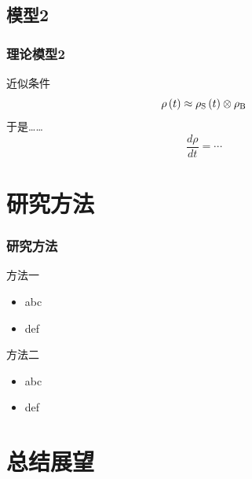 \documentclass[aspectratio=169]{ctexbeamer}
\begin{document}
\subsection{模型2}
\begin{frame}
  \frametitle{理论模型2}
  近似条件
  \begin{equation*}
    \rho\left(t\right)\approx\rho_{\rm S}\left(t\right)\otimes\rho_{\rm B}
  \end{equation*}
  \pause
  于是……
  \begin{equation*}
    \frac{d\rho}{d t}=\cdots
  \end{equation*}
  
\end{frame}


\section{研究方法}

\begin{frame}
  \frametitle{研究方法}
  \begin{block}{方法一}
    \begin{itemize}
      \item abc
      \item def
    \end{itemize}
  \end{block}
  \pause
  \begin{block}{方法二}
    \begin{itemize}
      \item abc
      \item def
    \end{itemize}
  \end{block}
\end{frame}


\section{总结展望}
\end{document}
